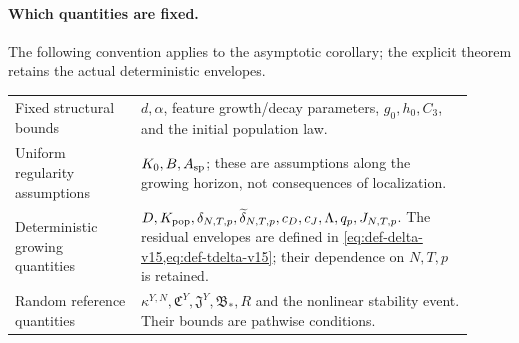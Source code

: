 \paragraph{Which quantities are fixed.}
The following convention applies to the asymptotic corollary; the explicit
theorem retains the actual deterministic envelopes.
\begin{center}
\begin{tabular}{p{0.25\linewidth}p{0.66\linewidth}}
Fixed structural bounds & $d,\alpha$, feature growth/decay parameters,
$g_0,h_0,C_3$, and the initial population law.\\
Uniform regularity assumptions & $K_0,B,A_{\rm sp}$; these are assumptions
along the growing horizon, not consequences of localization.\\
Deterministic growing quantities & $D,K_{\rm pop},\delta_{N,T,p},
\widetilde\delta_{N,T,p},c_D,c_J,\Lambda,q_p,J_{N,T,p}$.
The residual envelopes are defined in
\cref{eq:def-delta-v15,eq:def-tdelta-v15}; their dependence on $N,T,p$ is retained.\\
Random reference quantities & $\kappa^{Y,N},\mathfrak C^Y,\mathfrak J^Y,
\mathfrak B_*,R$ and the nonlinear stability event. Their bounds are pathwise conditions.
\end{tabular}
\end{center}

